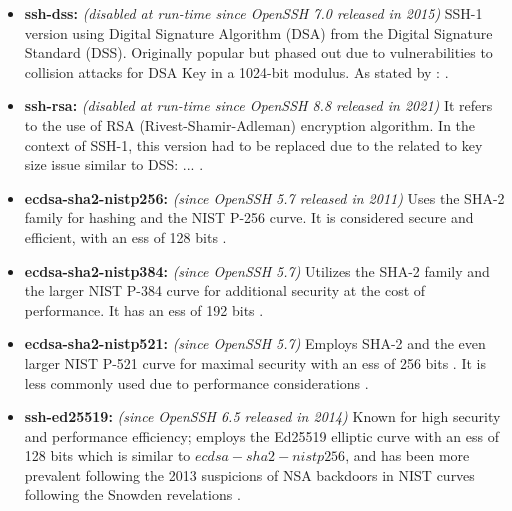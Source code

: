     \begin{itemize}
        \item \textbf{ssh-dss:} \textit{(disabled at run-time since OpenSSH 7.0 released in 2015)} SSH-1 version using Digital Signature Algorithm (DSA) from the Digital Signature Standard (DSS). Originally popular but phased out due to vulnerabilities to collision attacks for DSA Key in a 1024-bit modulus. As stated by :  \cite{RFC9142} \cite{OpenSSHReleaseNotes7-0}.
        
        \item \textbf{ssh-rsa:} \textit{(disabled at run-time since OpenSSH 8.8 released in 2021)} It refers to the use of RSA (Rivest-Shamir-Adleman) encryption algorithm. In the context of SSH-1, this version had to be replaced due to the related to key size issue similar to DSS: ...  \cite{RFC9142} \cite{OpenSSHReleaseNotes8-8}.
        
        \item \textbf{ecdsa-sha2-nistp256:} \textit{(since OpenSSH 5.7 released in 2011)} Uses the SHA-2 family for hashing and the NIST P-256 curve. It is considered secure and efficient, with an \acrfull{ess} of 128 bits \cite{RFC9142} \cite{OpenSSHReleaseNotes5-7}.
        
        \item \textbf{ecdsa-sha2-nistp384:} \textit{(since OpenSSH 5.7)} Utilizes the SHA-2 family and the larger NIST P-384 curve for additional security at the cost of performance. It has an \acrshort{ess} of 192 bits \cite{RFC9142} \cite{OpenSSHReleaseNotes5-7}.
        
        \item \textbf{ecdsa-sha2-nistp521:} \textit{(since OpenSSH 5.7)} Employs SHA-2 and the even larger NIST P-521 curve for maximal security with an \acrshort{ess} of 256 bits \cite{RFC9142}. It is less commonly used due to performance considerations \cite{OpenSSHReleaseNotes5-7}. 
        
        \item \textbf{ssh-ed25519:} \textit{(since OpenSSH 6.5 released in 2014)} Known for high security and performance efficiency; employs the Ed25519 elliptic curve with an \acrshort{ess} of 128 bits \cite{RFC9142} which is similar to $ecdsa-sha2-nistp256$, and has been more prevalent following the 2013 suspicions of NSA backdoors in NIST curves \cite{Adamantiadis2013} following the Snowden revelations \cite{NSAFoilSafeguards2013} \cite{GuardianEncryption2013} \cite{OpenSSHReleaseNotes6-5}.
        

\end{itemize}
